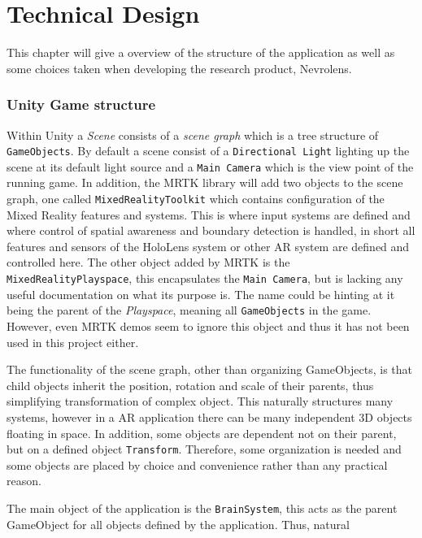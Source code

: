 \chapter{Technical Design}

This chapter will give a overview of the structure of the application as well as some choices taken when developing the research product, Nevrolens. 

\subsection*{Unity Game structure}

Within Unity a \textit{Scene} consists of a \textit{scene graph} which is a tree structure of \texttt{GameObjects}. By default a scene consist of a \texttt{Directional Light} lighting up the scene at its default light source and a \texttt{Main Camera} which is the view point of the running game. In addition, the MRTK library will add two objects to the scene graph, one called \texttt{MixedRealityToolkit} which contains configuration of the Mixed Reality features and systems. This is where input systems are defined and where control of spatial awareness and boundary detection is handled, in short all features and sensors of the HoloLens system or other AR system are defined and controlled here. The other object added by MRTK is the \texttt{MixedRealityPlayspace}, this encapsulates the \texttt{Main Camera}, but is lacking any useful documentation on what its purpose is. The name could be hinting at it being the parent of the \textit{Playspace}, meaning all \texttt{GameObjects} in the game. However, even MRTK demos seem to ignore this object and thus it has not been used in this project either.

The functionality of the scene graph, other than organizing GameObjects, is that child objects inherit the position, rotation and scale of their parents, thus simplifying transformation of complex object. This naturally structures many systems, however in a AR application there can be many independent 3D objects floating in space. In addition, some objects are dependent not on their parent, but on a defined object \texttt{Transform}. Therefore, some organization is needed and some objects are placed by choice and convenience rather than any practical reason.

The main object of the application is the \texttt{BrainSystem}, this acts as the parent GameObject for all objects defined by the application. 
Thus, natural

